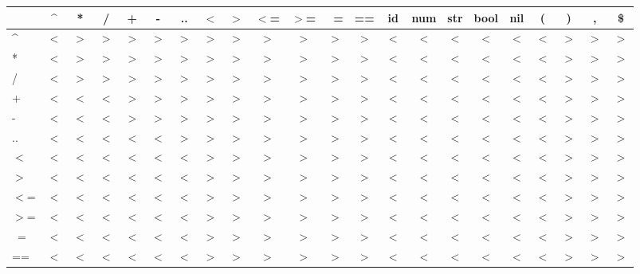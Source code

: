 \begin{sidewaystable}
\centering
\begin{tabular}{l | c c c c c c c c c c c c c c c c c c c c c}
      & \^{} & * & / & + & - & ..& $<$ & $>$ & $<$= & $>$= & ~= & == & id & num & str & bool & nil & (  & )  & ,  & \$ \\ \hline
  \^{}  & $<$ & $>$ & $>$ & $>$ & $>$ & $>$ & $>$ & $>$ & $>$  & $>$  & $>$  & $>$  & $<$  & $<$   & $<$   & $<$    &  $<$  & $<$  & $>$  & $>$  & $>$ \\
  *     & $<$ & $>$ & $>$ & $>$ & $>$ & $>$ & $>$ & $>$ & $>$  & $>$  & $>$  & $>$  & $<$  & $<$   & $<$   & $<$    &  $<$  & $<$  & $>$  & $>$  & $>$ \\
  /     & $<$ & $>$ & $>$ & $>$ & $>$ & $>$ & $>$ & $>$ & $>$  & $>$  & $>$  & $>$  & $<$  & $<$   & $<$   & $<$    &  $<$  & $<$  & $>$  & $>$  & $>$ \\
  +     & $<$ & $<$ & $<$ & $>$ & $>$ & $>$ & $>$ & $>$ & $>$  & $>$  & $>$  & $>$  & $<$  & $<$   & $<$   & $<$    &  $<$  & $<$  & $>$  & $>$  & $>$ \\
  -     & $<$ & $<$ & $<$ & $>$ & $>$ & $>$ & $>$ & $>$ & $>$  & $>$  & $>$  & $>$  & $<$  & $<$   & $<$   & $<$    &  $<$  & $<$  & $>$  & $>$  & $>$ \\
  ..    & $<$ & $<$ & $<$ & $<$ & $<$ & $>$ & $>$ & $>$ & $>$  & $>$  & $>$  & $>$  & $<$  & $<$   & $<$   & $<$    &  $<$  & $<$  & $>$  & $>$  & $>$ \\
  $<$     & $<$ & $<$ & $<$ & $<$ & $<$ & $<$ & $>$ & $>$ & $>$  & $>$  & $>$  & $>$  & $<$  & $<$   & $<$   & $<$    &  $<$  & $<$  & $>$  & $>$  & $>$ \\
  $>$     & $<$ & $<$ & $<$ & $<$ & $<$ & $<$ & $>$ & $>$ & $>$  & $>$  & $>$  & $>$  & $<$  & $<$   & $<$   & $<$    &  $<$  & $<$  & $>$  & $>$  & $>$ \\
  $<$=    & $<$ & $<$ & $<$ & $<$ & $<$ & $<$ & $>$ & $>$ & $>$  & $>$  & $>$  & $>$  & $<$  & $<$   & $<$   & $<$    &  $<$  & $<$  & $>$  & $>$  & $>$ \\
  $>$=    & $<$ & $<$ & $<$ & $<$ & $<$ & $<$ & $>$ & $>$ & $>$  & $>$  & $>$  & $>$  & $<$  & $<$   & $<$   & $<$    &  $<$  & $<$  & $>$  & $>$  & $>$ \\
  ~=    & $<$ & $<$ & $<$ & $<$ & $<$ & $<$ & $>$ & $>$ & $>$  & $>$  & $>$  & $>$  & $<$  & $<$   & $<$   & $<$    &  $<$  & $<$  & $>$  & $>$  & $>$ \\
  ==    & $<$ & $<$ & $<$ & $<$ & $<$ & $<$ & $>$ & $>$ & $>$  & $>$  & $>$  & $>$  & $<$  & $<$   & $<$   & $<$    &  $<$  & $<$  & $>$  & $>$  & $>$ \\

\end{tabular}
\end{sidewaystable}
